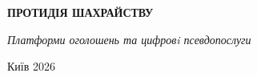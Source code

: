 ﻿%
\begin{titlepage}
\thispagestyle{empty}
\vspace*{2cm}
\begin{center}
{\large\scshape\bookauthor}
\end{center}
\vfill
\begin{center}
{\Huge\bfseries ПРОТИДІЯ ШАХРАЙСТВУ}

\vspace{1.2em}

{\Large\itshape Платформи оголошень та цифровi псевдопослуги}
\end{center}
\vfill
\begin{center}
Київ 2026\\
\end{center}
\end{titlepage}

\clearpage
